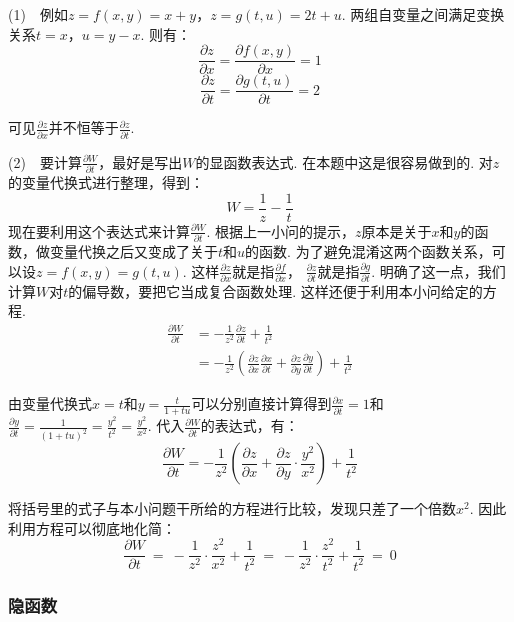 \begin{solution}
(1)~~例如$z=f(x,y)=x+y$，$z=g(t,u) = 2t+u$. 两组自变量之间满足变换关系$t=x$，$u=y-x$.
则有：
$$
\frac{\partial z}{\partial x} = \frac{\partial f(x,y)}{\partial x} = 1
$$
$$
\frac{\partial z}{\partial t} = \frac{\partial g(t,u)}{\partial t} = 2
$$\par
可见$\frac{\partial z}{\partial x}$并不恒等于$\frac{\partial z}{\partial t}$.\par

(2)~~要计算$\frac{\partial W}{\partial t}$，最好是写出$W$的显函数表达式. 在本题中这是很容易做到的.
对$z$的变量代换式进行整理，得到：
$$
W = \frac{1}{z} - \frac{1}{t}
$$
现在要利用这个表达式来计算$\frac{\partial W}{\partial t}$.
根据上一小问的提示，$z$原本是关于$x$和$y$的函数，做变量代换之后又变成了关于$t$和$u$的函数.
为了避免混淆这两个函数关系，可以设$z = f(x,y) = g(t,u)$.
这样$\frac{\partial z}{\partial x}$就是指$\frac{\partial f}{\partial x}$，
$\frac{\partial z}{\partial t}$就是指$\frac{\partial g}{\partial t}$.
明确了这一点，我们计算$W$对$t$的偏导数，要把它当成复合函数处理.
这样还便于利用本小问给定的方程.
\begin{equation}
    \begin{aligned}
        \frac{\partial W}{\partial t} &= -\frac{1}{z^2} \frac{\partial z}{\partial t} + \frac{1}{t^2} \\
        &= -\frac{1}{z^2} \left( \frac{\partial z}{\partial x} \frac{\partial x}{\partial t} + \frac{\partial z}{\partial y} \frac{\partial y}{\partial t} \right)
        + \frac{1}{t^2}
        \nonumber
    \end{aligned}
\end{equation}\par
由变量代换式$x = t$和$y = \frac{t}{1 + tu}$可以分别直接计算得到$\frac{\partial x}{\partial t}=1$和
$\frac{\partial y}{\partial t} = \frac{1}{(1 + tu)^2} = \frac{y^2}{t^2} = \frac{y^2}{x^2}$.
代入$\frac{\partial W}{\partial t}$的表达式，有：
$$
\frac{\partial W}{\partial t}  =
-\frac{1}{z^2} \left( \frac{\partial z}{\partial x} + \frac{\partial z}{\partial y}\cdot \frac{y^2}{x^2} \right) + \frac{1}{t^2}
$$

将括号里的式子与本小问题干所给的方程进行比较，发现只差了一个倍数$x^2$.
因此利用方程可以彻底地化简：
$$
\frac{\partial W}{\partial t}  ~= ~
-\frac{1}{z^2} \cdot \frac{z^2}{x^2} + \frac{1}{t^2} ~=~ -\frac{1}{z^2} \cdot \frac{z^2}{t^2} + \frac{1}{t^2}~=~ 0
$$
\end{solution}

\subsubsection{隐函数}

